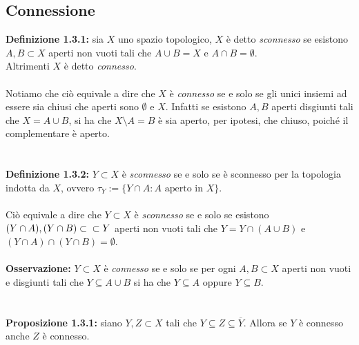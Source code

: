 \documentclass{article}
\begin{document}
\subsection{Connessione}
\textbf{Definizione 1.3.1:} sia $X$ uno spazio topologico, $X$ è detto \textit{sconnesso} se esistono $A, B \subset X$ aperti non vuoti tali che $A \cup B = X$ e $A \cap B = \emptyset$. \\ Altrimenti $X$ è detto \textit{connesso}. \\ \\
Notiamo che ciò equivale a dire che $X$ è \textit{connesso} se e solo se gli unici insiemi ad essere sia chiusi che aperti sono $\emptyset$ e $X$. Infatti se esistono $A, B$ aperti disgiunti tali che $X = A \cup B$, si ha che $X \setminus A = B$ è sia aperto, per ipotesi, che chiuso, poiché il complementare è aperto. \\ \\ \\
\textbf{Definizione 1.3.2:} $Y \subset X$ è \textit{sconnesso} se e solo se è sconnesso per la topologia indotta da $X$, ovvero $\tau_Y := \{ Y \cap A : A \text{ aperto in } X \}$. \\ \\
Ciò equivale a dire che $Y \subset X$ è \textit{sconnesso} se e solo se esistono $(Y \cap A), (Y \cap B) \subset\\\subset Y$ aperti non vuoti tali che $Y = Y \cap (A \cup B)$ e $(Y \cap A) \cap (Y \cap B) = \emptyset$. \\ \\
\textbf{Osservazione:} $Y \subset X$ è \textit{connesso} se e solo se per ogni $A, B \subset X$ aperti non vuoti e disgiunti tali che $Y \subseteq A \cup B$ si ha che $Y \subseteq A$ oppure $Y \subseteq B$. \\ \\ \\
\textbf{Proposizione 1.3.1:} siano $Y, Z \subset X$ tali che $Y \subseteq Z \subseteq \overline{Y}$. Allora se $Y$ è connesso anche $Z$ è connesso. \\
\end{document}

